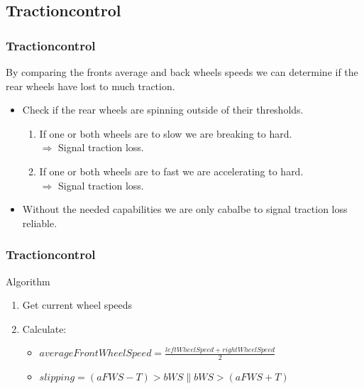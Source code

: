 \documentclass{beamer}
\begin{document}
\subsection{Tractioncontrol}
\begin{frame}
    \frametitle{Tractioncontrol}
    By comparing the fronts average and back wheels speeds we can determine if the rear wheels have lost to much traction.
    \begin{itemize}
    \item Check if the rear wheels are spinning outside of their thresholds.\\
        \begin{enumerate}
        \item If one or both wheels are to slow we are breaking to hard.\\
        $\Rightarrow$ Signal traction loss.\\
        \item If one or both wheels are to fast we are accelerating to hard.\\
        $\Rightarrow$ Signal traction loss.
        \end{enumerate}
     \pause
     \item Without the needed capabilities we are only cabalbe to signal traction loss reliable.
     \pause
    \end{itemize}
\end{frame}
\begin{frame}
    \frametitle{Tractioncontrol}
    Algorithm
    \begin{enumerate}
        \item Get current wheel speeds
        \item Calculate: 
        \begin{itemize}
            \item $averageFrontWheelSpeed = \frac{leftWheelSpeed + rightWheelSpeed}{2}$
            \item $slipping = (aFWS-T) > bWS \parallel bWS > (aFWS+T)$
        \end{itemize}
    \end{enumerate}
\end{frame}
\end{document}
